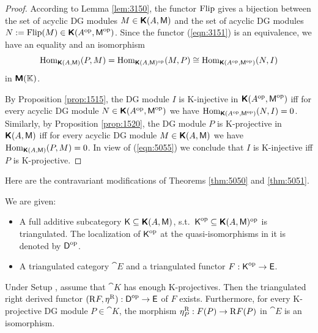 \begin{proof} 
According to Lemma \ref{lem:3150}, the functor 
$\operatorname{Flip}$ gives a bijection between the set of acyclic DG modules 
$M \in \boldsymbol{\mathsf{K}}(A, \operatorname{\mathsf{M}})$
and the set of acyclic DG modules 
$ N := \operatorname{Flip}(M) \in \boldsymbol{\mathsf{K}}(A^{\mathrm{op}}, \operatorname{\mathsf{M}}^{\mathrm{op}})$.
Since the functor (\ref{eqn:3151}) is an equivalence, we 
have an equality and an isomorphism
\begin{equation} \label{eqn:5055}
\operatorname{Hom}_{\boldsymbol{\mathsf{K}}(A, \operatorname{\mathsf{M}})} (P, M) = 
\operatorname{Hom}_{\boldsymbol{\mathsf{K}}(A, \operatorname{\mathsf{M}})^{\mathrm{op}}} (M, P) \cong 
\operatorname{Hom}_{\boldsymbol{\mathsf{K}}(A^{\mathrm{op}}, \operatorname{\mathsf{M}}^{\mathrm{op}})} (N, I)  
\end{equation}
in $\boldsymbol{\mathsf{M}}(\mathbb{K})$.

By Proposition \ref{prop:1515}, the DG 
module $I$ is K-injective in 
$\boldsymbol{\mathsf{K}}(A^{\mathrm{op}}, \operatorname{\mathsf{M}}^{\mathrm{op}})$
iff for every acyclic DG module 
$N \in \boldsymbol{\mathsf{K}}(A^{\mathrm{op}}, \operatorname{\mathsf{M}}^{\mathrm{op}})$
we have 
$\operatorname{Hom}_{\boldsymbol{\mathsf{K}}(A^{\mathrm{op}}, \operatorname{\mathsf{M}}^{\mathrm{op}})}(N, I) = 0$.
Similarly, by Proposition \ref{prop:1520}, the DG 
module $P$ is K-projective in $\boldsymbol{\mathsf{K}}(A, \operatorname{\mathsf{M}})$
iff for every acyclic DG module 
$M \in \boldsymbol{\mathsf{K}}(A, \operatorname{\mathsf{M}})$ we have 
$\operatorname{Hom}_{\boldsymbol{\mathsf{K}}(A, \operatorname{\mathsf{M}})}(P, M) = 0$.
In view of (\ref{eqn:5055}) we conclude that $I$ is K-injective iff $P$ is 
K-projective.
\end{proof}

Here are the contravariant modifications of Theorems \ref{thm:5050} and 
\ref{thm:5051}. 

\begin{setup} \label{set:3150}
We are given:
\begin{itemize}
\item A full additive subcategory
$\operatorname{\mathsf{K}} \subseteq \boldsymbol{\mathsf{K}}(A, \operatorname{\mathsf{M}})$, 
s.t.\ $\operatorname{\mathsf{K}}^{\mathrm{op}} \subseteq \boldsymbol{\mathsf{K}}(A, \operatorname{\mathsf{M}})^{\mathrm{op}}$
is triangulated. The localization of $\operatorname{\mathsf{K}}^{\mathrm{op}}$ at the 
quasi-isomorphisms in it is denoted by $\operatorname{\mathsf{D}}^{\mathrm{op}}$.  

\item A triangulated category $\cat{E}$ and  a triangulated functor
$F : \operatorname{\mathsf{K}}^{\mathrm{op}} \to \operatorname{\mathsf{E}}$.
\end{itemize}
\end{setup}

\begin{thm} \label{thm:3150}
Under Setup \tup{\ref{set:3150}}, 
assume that $\cat{K}$ has enough K-projectives. 
Then the triangulated right derived functor 
$(\mathrm{R} F, \eta^{\mathrm{R}}) : \operatorname{\mathsf{D}}^{\mathrm{op}} \to \operatorname{\mathsf{E}}$
of $F$ exists. Furthermore, for every K-projective DG module
$P \in \cat{K}$, the morphism 
$\eta^{\mathrm{R}}_P : F(P) \to \mathrm{R} F(P)$ 
in $\cat{E}$ is an isomorphism. 
\end{thm}

